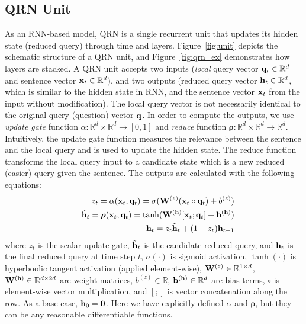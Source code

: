 \documentclass[table]{article}
\begin{document}
\subsection{QRN Unit}\label{sec:model}
As an RNN-based model, QRN is a single recurrent unit that updates its hidden state (reduced query) through time and layers. Figure~\ref{fig:unit} depicts the schematic structure of a QRN unit, and Figure~\ref{fig:qrn_ex} demonstrates how layers are stacked.
A QRN unit accepts two inputs (\emph{local} query vector ${\bf q}_t \in \mathbb{R}^d$ and sentence vector ${\bf x}_t \in \mathbb{R}^d$), and two outputs (reduced query vector ${\bf h}_t \in \mathbb{R}^d$, which is similar to the hidden state in RNN, and the sentence vector ${\bf x}_t$ from the input without modification).
The local query vector is not necessarily identical to the original query (question) vector ${\bf q}$.
In order to compute the outputs, we use \emph{update gate} function $\alpha: \mathbb{R}^d \times \mathbb{R}^d \rightarrow [0, 1]$ and \emph{reduce} function $\bm{\rho}: \mathbb{R}^d \times \mathbb{R}^d \rightarrow \mathbb{R}^d$. 
Intuitively, the update gate function measures the relevance between the sentence and the local query and is used to update the hidden state. 
The reduce function transforms the local query input to a candidate state which is a new reduced (easier) query given the sentence.
The outputs are calculated with the following equations:
\begin{eqnarray}\label{eq:z}
&& z_t= \alpha({\bf x}_t, {\bf q}_t) = \sigma({\bf W}^{(z)} ({\bf x}_t \circ {\bf q}_t) + b^{(z)})\\
&&{\tilde {\bf h}}_t = {\bm \rho}({\bf x}_t, {\bf q}_t) = \tanh({\bf W}^{({\bf h})}[{\bf x}_t; {\bf q}_t] + {\bf b}^{({\bf h})}) \label{eq:ht}\\
&&{\bf h}_t = z_t {\tilde {\bf h}}_t + (1 - z_t) {\bf h}_{t-1}\label{eq:h}
\end{eqnarray}
where $z_t$ is the scalar update gate, ${\tilde {\bf h}}_t$ is the candidate reduced query, and ${\bf h}_t$ is the final reduced query at time step $t$,
$\sigma(\cdot)$ is sigmoid activation, $\tanh(\cdot)$ is hyperboolic tangent activation (applied element-wise),
${\bf W}^{(z)} \in \mathbb{R}^{1 \times d}$, ${\bf W}^{({\bf h})} \in \mathbb{R}^{d \times 2d}$ are weight matrices, 
$b^{(z)} \in \mathbb{R}$, ${\bf b}^{({\bf h})} \in \mathbb{R}^d$ are bias terms,
$\circ$ is element-wise vector multiplication, and $[;]$ is vector concatenation along the row.
As a base case, ${\bf h}_0 = {\bf 0}$.
Here we have explicitly defined $\alpha$ and ${\bm \rho}$,
but they can be any reasonable differentiable functions.
\end{document}
